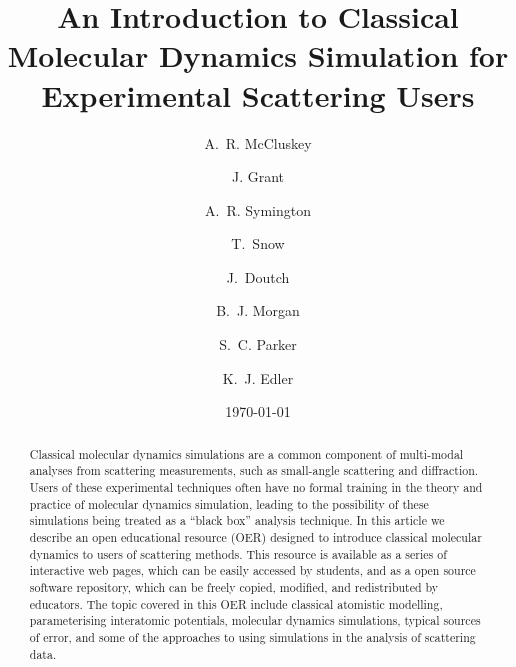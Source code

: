 \documentclass[amsmath,amssymb,twocolumn,superscriptaddress]{revtex4-1}
\begin{document}

\title{An Introduction to Classical Molecular Dynamics Simulation for Experimental Scattering Users}

\author{A.~R. McCluskey}

\author{J. Grant}

\author{A.~R. Symington}

\author{T.~Snow}

\author{J.~Doutch}

\author{B.~J. Morgan}

\author{S.~C. Parker}

\author{K.~J. Edler}

\date{\today}

\begin{abstract}
\noindent Classical molecular dynamics simulations are a common component of multi-modal analyses from scattering measurements, such as small-angle scattering and diffraction.
Users of these experimental techniques often have no formal training in the theory and practice of molecular dynamics simulation, leading to the possibility of these simulations being treated as a ``black box'' analysis technique.
In this article we describe an open educational resource (OER) designed to introduce classical molecular dynamics to users of scattering methods.
This resource is available as a series of interactive web pages, which can be easily accessed by students, and as a open source software repository, which can be freely copied, modified, and redistributed by educators.
The topic covered in this OER include classical atomistic modelling, parameterising interatomic potentials, molecular dynamics simulations, typical sources of error, and some of the approaches to using simulations in the analysis of scattering data.
\end{abstract}
\end{document}
